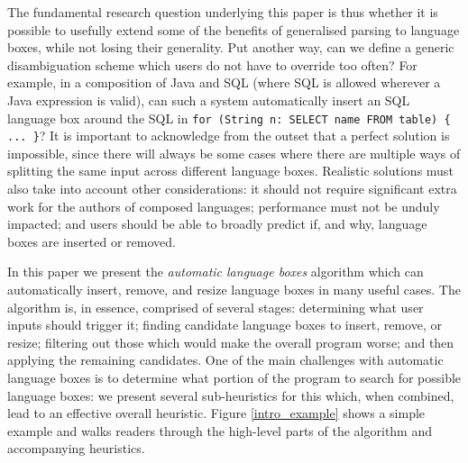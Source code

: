 \documentclass[sigplan,screen]{acmart}\settopmatter{printfolios=true,printccs=false,printacmref=false}
\begin{document}
The fundamental research question underlying this paper is thus whether it is
possible to usefully extend some of the benefits of generalised parsing to language
boxes, while not losing their generality. Put another way, can we define a generic
disambiguation scheme which users do not have to override too often?
For example, in a composition of Java and SQL (where SQL is allowed
wherever a Java expression is valid), can such a system automatically insert an
SQL language box around the SQL in \texttt{for (String n: SELECT name FROM table) \{ ...
\}}? It is important to acknowledge from the outset that a perfect solution
is impossible, since there will always be some cases where there are multiple
ways of splitting the same input across different language boxes. Realistic
solutions must also take into account other considerations: it should not
require significant extra work for the authors of composed languages; performance must
not be unduly impacted; and users should be able to broadly predict if, and
why, language boxes are inserted or removed.

In this paper we present the \emph{automatic language boxes} algorithm which
can automatically insert, remove, and resize language
boxes in many useful cases. The algorithm is, in essence, comprised of several
stages: determining what user inputs should trigger it; finding candidate language
boxes to insert, remove, or resize; filtering out those which would make the
overall program worse; and then applying the remaining candidates. One of the main challenges with
automatic language boxes is to determine what portion of the program to search
for possible language boxes: we present several sub-heuristics for this
which, when combined, lead to an effective overall heuristic. Figure
\ref{intro_example} shows a simple example and walks readers through the high-level
parts of the algorithm and accompanying heuristics.
\end{document}
